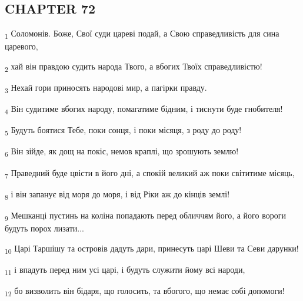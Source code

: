 \subsection{CHAPTER 72}
\begin{tcolorbox}
\textsubscript{1} Соломонів. Боже, Свої суди цареві подай, а Свою справедливість для сина царевого,
\end{tcolorbox}
\begin{tcolorbox}
\textsubscript{2} хай він правдою судить народа Твого, а вбогих Твоїх справедливістю!
\end{tcolorbox}
\begin{tcolorbox}
\textsubscript{3} Нехай гори приносять народові мир, а пагірки правду.
\end{tcolorbox}
\begin{tcolorbox}
\textsubscript{4} Він судитиме вбогих народу, помагатиме бідним, і тиснути буде гнобителя!
\end{tcolorbox}
\begin{tcolorbox}
\textsubscript{5} Будуть боятися Тебе, поки сонця, і поки місяця, з роду до роду!
\end{tcolorbox}
\begin{tcolorbox}
\textsubscript{6} Він зійде, як дощ на покіс, немов краплі, що зрошують землю!
\end{tcolorbox}
\begin{tcolorbox}
\textsubscript{7} Праведний буде цвісти в його дні, а спокій великий аж поки світитиме місяць,
\end{tcolorbox}
\begin{tcolorbox}
\textsubscript{8} і він запанує від моря до моря, і від Ріки аж до кінців землі!
\end{tcolorbox}
\begin{tcolorbox}
\textsubscript{9} Мешканці пустинь на коліна попадають перед обличчям його, а його вороги будуть порох лизати...
\end{tcolorbox}
\begin{tcolorbox}
\textsubscript{10} Царі Таршішу та островів дадуть дари, принесуть царі Шеви та Севи дарунки!
\end{tcolorbox}
\begin{tcolorbox}
\textsubscript{11} і впадуть перед ним усі царі, і будуть служити йому всі народи,
\end{tcolorbox}
\begin{tcolorbox}
\textsubscript{12} бо визволить він бідаря, що голосить, та вбогого, що немає собі допомоги!
\end{tcolorbox}
